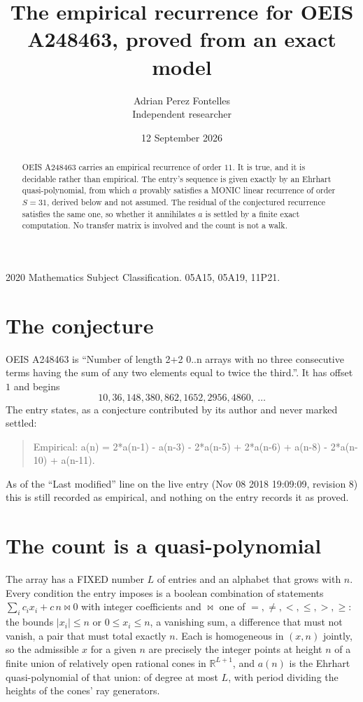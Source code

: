 \documentclass[11pt,a4paper]{article}
\title{The empirical recurrence for OEIS A248463, proved from an exact model}
\author{Adrian Perez Fontelles\\ \small Independent researcher}
\date{12 September 2026}
\theoremstyle{plain}
\theoremstyle{definition}
\begin{document}
\maketitle

\begin{abstract}
OEIS A248463 carries an empirical recurrence of order $11$. It is true, and it is
decidable rather than empirical. The entry's sequence is given exactly by an Ehrhart quasi-polynomial, from
which $a$ provably satisfies a MONIC linear recurrence of order $S=31$, derived below and not
assumed. The residual of the conjectured recurrence satisfies the same one, so whether it
annihilates $a$ is settled by a finite exact computation. No transfer matrix is involved and
the count is not a walk.
\end{abstract}

\noindent\small 2020 Mathematics Subject Classification. 05A15, 05A19, 11P21.\normalsize

\section{The conjecture}

OEIS A248463 is ``Number of length 2+2 0..n arrays with no three consecutive terms having the sum of any two elements equal to twice the third.''. It has offset $1$ and begins
\[
10, 36, 148, 380, 862, 1652, 2956, 4860,\ \dots
\]
The entry states, as a conjecture contributed by its author and never marked settled:
\begin{quote}
Empirical: a(n) = 2*a(n-1) - a(n-3) - 2*a(n-5) + 2*a(n-6) + a(n-8) - 2*a(n-10) + a(n-11).
\end{quote}
As of the ``Last modified'' line on the live entry (Nov 08 2018 19:09:09, revision 8)
this is still recorded as empirical, and nothing on the entry records it as proved.

\section{The count is a quasi-polynomial}

The array has a FIXED number $L$ of entries and an alphabet that grows with $n$. Every
condition the entry imposes is a boolean combination of statements
$\sum_i c_ix_i + c\,n \bowtie 0$ with integer coefficients and $\bowtie$ one of
$=,\ne,<,\le,>,\ge$: the bounds $|x_i|\le n$ or $0\le x_i\le n$, a vanishing sum, a difference
that must not vanish, a pair that must total exactly $n$. Each is homogeneous in $(x,n)$
jointly, so the admissible $x$ for a given $n$ are precisely the integer points at height $n$
of a finite union of relatively open rational cones in $\mathbb{R}^{L+1}$, and $a(n)$ is
the Ehrhart quasi-polynomial of that union: of degree at most $L$, with period dividing the
heights of the cones' ray generators.
\end{document}
